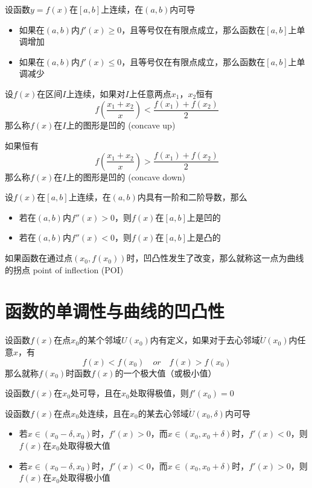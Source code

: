 \documentclass[UTF8]{ctexart}
\begin{document}
\bigskip

设函数$y=f(x)$在$[a,b]$上连续，在$(a,b)$内可导
\begin{itemize}
  \item 如果在$(a,b)$内$f'(x)\ge0$，且等号仅在有限点成立，那么函数在$[a,b]$上单调增加
  \item 如果在$(a,b)$内$f'(x)\le0$，且等号仅在有限点成立，那么函数在$[a,b]$上单调减少
\end{itemize}

\bigskip

设$f(x)$在区间$I$上连续，如果对$I$上任意两点$x_1$，$x_2$恒有
\[ f(\frac{x_1+x_2}{x})<\frac{f(x_1)+f(x_2)}{2} \]
那么称$f(x)$在$I$上的图形是凹的 (concave up)

如果恒有
\[ f(\frac{x_1+x_2}{x})>\frac{f(x_1)+f(x_2)}{2} \]
那么称$f(x)$在$I$上的图形是凹的 (concave down)

\bigskip

设$f(x)$在$[a,b]$上连续，在$(a,b)$内具有一阶和二阶导数，那么
\begin{itemize}
  \item 若在$(a,b)$内$f''(x)>0$，则$f(x)$在$[a,b]$上是凹的
  \item 若在$(a,b)$内$f''(x)<0$，则$f(x)$在$[a,b]$上是凸的
\end{itemize}

\bigskip

如果函数在通过点$(x_0,f(x_0))$时，凹凸性发生了改变，那么就称这一点为曲线的拐点 point of inflection (POI)

\bigskip
\bigskip

\section*{函数的单调性与曲线的凹凸性}

\bigskip

设函数$f(x)$在点$x_0$的某个邻域$U(x_0)$内有定义，如果对于去心邻域$\mathring{U}(x_0)$内任意$x$，有
\[ f(x)<f(x_0)\quad or \quad f(x)>f(x_0) \]
那么就称$f(x_0)$时函数$f(x)$的一个极大值（或极小值）

\bigskip

设函数$f(x)$在$x_0$处可导，且在$x_0$处取得极值，则$f'(x_0)=0$

\bigskip

设函数$f(x)$在点$x_0$处连续，且在$x_0$的某去心邻域$\mathring{U}(x_0,\delta)$内可导
\begin{itemize}
  \item 若$x\in(x_0-\delta,x_0)$时，$f'(x)>0$，而$x\in(x_0,x_0+\delta)$时，$f'(x)<0$，则$f(x)$在$x_0$处取得极大值
  \item 若$x\in(x_0-\delta,x_0)$时，$f'(x)<0$，而$x\in(x_0,x_0+\delta)$时，$f'(x)>0$，则$f(x)$在$x_0$处取得极小值
\end{itemize}
\end{document}
